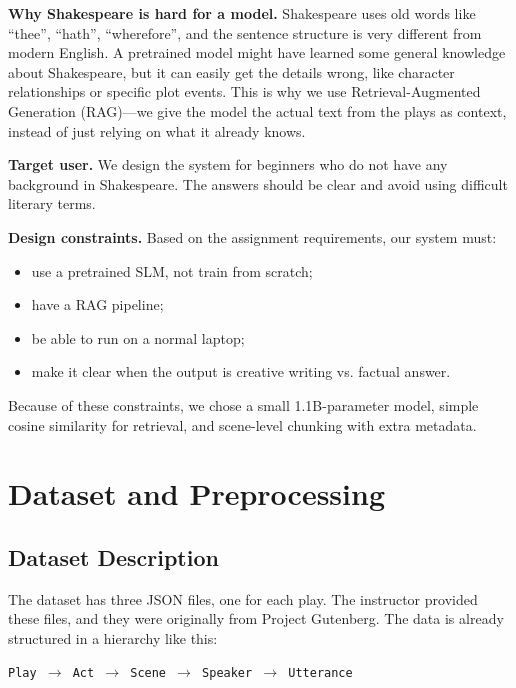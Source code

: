 \documentclass[10pt,conference]{IEEEtran}
\begin{document}
\textbf{Why Shakespeare is hard for a model.} Shakespeare uses old words like ``thee'', ``hath'', ``wherefore'', and the sentence structure is very different from modern English. A pretrained model might have learned some general knowledge about Shakespeare, but it can easily get the details wrong, like character relationships or specific plot events. This is why we use Retrieval-Augmented Generation (RAG)---we give the model the actual text from the plays as context, instead of just relying on what it already knows.

\textbf{Target user.} We design the system for beginners who do not have any background in Shakespeare. The answers should be clear and avoid using difficult literary terms.

\textbf{Design constraints.} Based on the assignment requirements, our system must:
\begin{itemize}
    \item use a pretrained SLM, not train from scratch;
    \item have a RAG pipeline;
    \item be able to run on a normal laptop;
    \item make it clear when the output is creative writing vs. factual answer.
\end{itemize}

Because of these constraints, we chose a small 1.1B-parameter model, simple cosine similarity for retrieval, and scene-level chunking with extra metadata.

\section{Dataset and Preprocessing}
\label{sec:dataset}

\subsection{Dataset Description}

The dataset has three JSON files, one for each play. The instructor provided these files, and they were originally from Project Gutenberg. The data is already structured in a hierarchy like this:

\begin{center}
\texttt{Play $\rightarrow$ Act $\rightarrow$ Scene $\rightarrow$ Speaker $\rightarrow$ Utterance}
\end{center}
\end{document}
